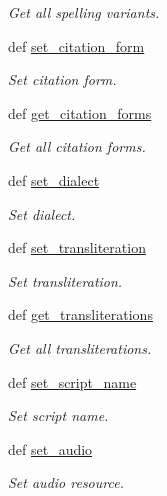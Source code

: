 \begin{DoxyCompactItemize}
\begin{DoxyCompactList}\small\item\em Get all spelling variants. \end{DoxyCompactList}\item 
def \hyperlink{classlmf_1_1src_1_1morphology_1_1lemma_1_1_lemma_a349b6a8d0a6a571933cd2bede36f695b}{set\+\_\+citation\+\_\+form}
\begin{DoxyCompactList}\small\item\em Set citation form. \end{DoxyCompactList}\item 
def \hyperlink{classlmf_1_1src_1_1morphology_1_1lemma_1_1_lemma_a0d14b66ae5d6f0fd8a9aba74520b88a0}{get\+\_\+citation\+\_\+forms}
\begin{DoxyCompactList}\small\item\em Get all citation forms. \end{DoxyCompactList}\item 
def \hyperlink{classlmf_1_1src_1_1morphology_1_1lemma_1_1_lemma_aa22e9424fc9f35cea9eb1a0a47b3a420}{set\+\_\+dialect}
\begin{DoxyCompactList}\small\item\em Set dialect. \end{DoxyCompactList}\item 
def \hyperlink{classlmf_1_1src_1_1morphology_1_1lemma_1_1_lemma_aa7fbf68d0e986a478493cbf450ae8357}{set\+\_\+transliteration}
\begin{DoxyCompactList}\small\item\em Set transliteration. \end{DoxyCompactList}\item 
def \hyperlink{classlmf_1_1src_1_1morphology_1_1lemma_1_1_lemma_a3e9430de1e0739171a6f655893863708}{get\+\_\+transliterations}
\begin{DoxyCompactList}\small\item\em Get all transliterations. \end{DoxyCompactList}\item 
def \hyperlink{classlmf_1_1src_1_1morphology_1_1lemma_1_1_lemma_aae4244411f218ebc08fc659b1388d7a0}{set\+\_\+script\+\_\+name}
\begin{DoxyCompactList}\small\item\em Set script name. \end{DoxyCompactList}\item 
def \hyperlink{classlmf_1_1src_1_1morphology_1_1lemma_1_1_lemma_abd01bcafb2648b945f049b7852837d67}{set\+\_\+audio}
\begin{DoxyCompactList}\small\item\em Set audio resource. \end{DoxyCompactList}\end{DoxyCompactItemize}
